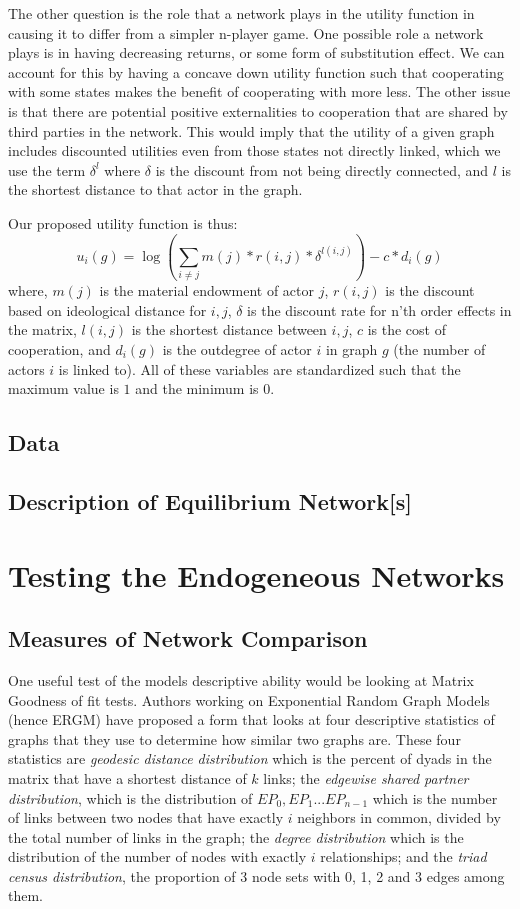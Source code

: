 \documentclass[12pt,onesided,fullpage]{amsart}
\begin{document}
The other question is the role that a network plays in the utility function in causing it to differ from a simpler n-player game. One possible role a network plays is in having decreasing returns, or some form of substitution effect. We can account for this by having a concave down utility function such that cooperating with some states makes the benefit of cooperating with more less. The other issue is that there are potential positive externalities to cooperation that are shared by third parties in the network. This would imply that the utility of a given graph includes discounted utilities even from those states not directly linked, which we use the term $\delta^{l}$ where $\delta$ is the discount from not being directly connected, and $l$ is the shortest distance to that actor in the graph.

Our proposed utility function is thus:
\begin{equation}
u_{i}(g) = \log (\sum_{i \neq j}  m(j)*r(i,j)*\delta^{l(i,j)}) - c*d_{i}(g)
\end{equation}
where, $m(j)$ is the material endowment of actor $j$, $r(i,j)$ is the discount based on ideological distance for $i, j$, $\delta$ is the discount rate for n'th order effects in the matrix, $l(i,j)$ is the shortest distance between $i, j$, $c$ is the cost of cooperation, and $d_{i}(g)$ is the outdegree of actor $i$ in graph $g$ (the number of actors $i$ is linked to). All of these variables are standardized such that the maximum value is $1$ and the minimum is $0$.

\subsection{Data}
\subsection{Description of Equilibrium Network[s]}


\section{Testing the Endogeneous Networks}
\subsection{Measures of Network Comparison}
One useful test of the models descriptive ability would be looking at Matrix Goodness of fit tests. Authors working on Exponential Random Graph Models (hence ERGM) have proposed a form that looks at four descriptive statistics of graphs that they use to determine how similar two graphs are. These four statistics are \emph{geodesic distance distribution} which is the percent of dyads in the matrix that have a shortest distance of $k$ links; the \emph{edgewise shared partner distribution}, which is the distribution of $EP_0, EP_1...EP_{n-1}$ which is the number of links between two nodes that have exactly $i$ neighbors in common, divided by the total number of links in the graph; the \emph{degree distribution} which is the distribution of the number of nodes with exactly $i$ relationships; and the \emph{triad census distribution}, the proportion of 3 node sets with 0, 1, 2 and 3 edges among them.
\end{document}
